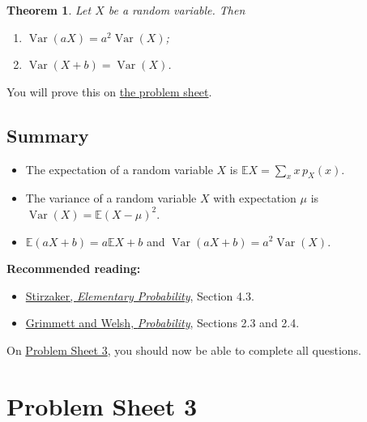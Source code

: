 \documentclass[
  a4paper,
]{book}
\providecommand{\tightlist}{%
  \setlength{\itemsep}{0pt}\setlength{\parskip}{0pt}}
\newtheorem{theorem}{Theorem}[chapter]
\theoremstyle{definition}
\theoremstyle{definition}
\theoremstyle{definition}
\theoremstyle{definition}
\theoremstyle{remark}
\begin{document}
\begin{theorem}

Let \(X\) be a random variable. Then

\begin{enumerate}
\def\labelenumi{\arabic{enumi}.}
\tightlist
\item
  \(\operatorname{Var}(aX) = a^2\operatorname{Var}(X)\);
\item
  \(\operatorname{Var}(X + b) = \operatorname{Var}(X)\).
\end{enumerate}

\end{theorem}

You will prove this on \protect\hyperlink{P3}{the problem sheet}.

\hypertarget{summary-L10}{%
\section*{Summary}\label{summary-L10}}

\begin{itemize}
\tightlist
\item
  The expectation of a random variable \(X\) is \(\mathbb EX = \sum_x x\, p_X(x)\).
\item
  The variance of a random variable \(X\) with expectation \(\mu\) is \(\operatorname{Var}(X) = \mathbb E(X - \mu)^2\).
\item
  \(\mathbb E(aX+b) = a\mathbb EX + b\) and \(\operatorname{Var}(aX+b) = a^2\operatorname{Var}(X)\).
\end{itemize}

\textbf{Recommended reading:}

\begin{itemize}
\tightlist
\item
  \href{https://leeds.primo.exlibrisgroup.com/permalink/44LEE_INST/13rlbcs/alma991013131349705181}{Stirzaker, \emph{Elementary Probability}}, Section 4.3.
\item
  \href{https://leeds.primo.exlibrisgroup.com/permalink/44LEE_INST/13rlbcs/alma991002938669705181}{Grimmett and Welsh, \emph{Probability}}, Sections 2.3 and 2.4.
\end{itemize}

On \protect\hyperlink{P3}{Problem Sheet 3}, you should now be able to complete all questions.

\hypertarget{P3}{%
\chapter*{Problem Sheet 3}\label{P3}}
\end{document}
